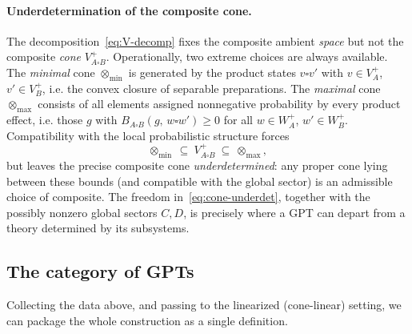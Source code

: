 \documentclass[prl,aps,10pt,superscriptaddress, floatfix]{revtex4-2}
\begin{document}
\paragraph{Underdetermination of the composite cone.}
The decomposition~\eqref{eq:V-decomp} fixes the composite ambient \emph{space} but not the composite \emph{cone} $V_{A\square B}^+$. Operationally, two extreme choices are always available. The \emph{minimal} cone $\otimes_{\min}$ is generated by the product states $v\square v'$ with $v\in V_A^+$, $v'\in V_B^+$, i.e. the convex closure of separable preparations. The \emph{maximal} cone $\otimes_{\max}$ consists of all elements assigned nonnegative probability by every product effect, i.e. those $g$ with $B_{A\square B}(g,\,w\square w')\ge 0$ for all $w\in W_A^+$, $w'\in W_B^+$. Compatibility with the local probabilistic structure forces
\begin{equation}\label{eq:cone-underdet}
\otimes_{\min}\ \subseteq\ V_{A\square B}^+\ \subseteq\ \otimes_{\max},
\end{equation}
but leaves the precise composite cone \emph{underdetermined}: any proper cone lying between these bounds (and compatible with the global sector) is an admissible choice of composite. The freedom in~\eqref{eq:cone-underdet}, together with the possibly nonzero global sectors $C,D$, is precisely where a GPT can depart from a theory determined by its subsystems.

\subsection{The category of GPTs}

Collecting the data above, and passing to the linearized (cone-linear) setting, we can package the whole construction as a single definition.
\end{document}
